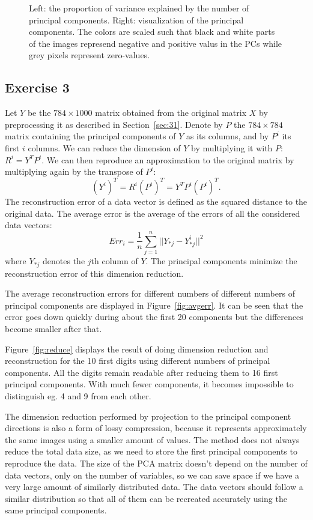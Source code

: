 \documentclass{article}
\begin{document}
\begin{figure}
	\caption{Left: the proportion of variance explained by the number of principal components.
	Right: visualization of the principal components.
The colors are scaled such that black and white parts of the images represend negative and positive valus in the PCs while grey pixels represent zero-values.}\label{fig:pcavar}
\end{figure}

\subsection{Exercise 3}
Let $Y$ be the $784\times 1000$ matrix obtained from the original matrix $X$ by preprocessing it as described in Section~\ref{sec:31}.
Denote by $P$ the $784\times 784$ matrix containing the principal components of $Y$ as its columns, and by $P^i$ its first $i$ columns.
We can reduce the dimension of $Y$ by multiplying it with $P$: $R^i=Y^TP^i$.
We can then reproduce an approximation to the original matrix by multiplying again by the transpose of $P^i$: $$(Y^i)^T=R^i(P^i)^T=Y^TP^i(P^i)^T.$$
The reconstruction error of a data vector is defined as the squared distance to the original data. The average error is the average of the errors of all the considered data vectors:
$$Err_i = \frac{1}{n}\sum_{j=1}^{n}||Y_{*j}-Y^i_{*j}||^2$$ where $Y_{*j}$ denotes the $j$th column of $Y$. The principal components minimize the reconstruction error of this dimension reduction.

The average reconstruction errors for different numbers of different numbers of principal components are displayed in Figure~\ref{fig:avgerr}.
It can be seen that the error goes down quickly during about the first 20 components but the differences become smaller after that.

Figure~\ref{fig:reduce} displays the result of doing dimension reduction and reconstruction for the 10 first digits using different numbers of principal components.
All the digits remain readable after reducing them to 16 first principal components.
With much fewer components, it becomes impossible to distinguish eg. 4 and 9 from each other.

The dimension reduction performed by projection to the principal component directions is also a form of lossy compression, because it represents approximately the same images using a smaller amount of values.
The method does not always reduce the total data size, as we need to store the first principal components to reproduce the data.
The size of the PCA matrix doesn't depend on the number of data vectors, only on the number of variables, so we can save space if we have a very large amount of similarly distributed data.
The data vectors should follow a similar distribution so that all of them can be recreated accurately using the same principal components.
\end{document}
